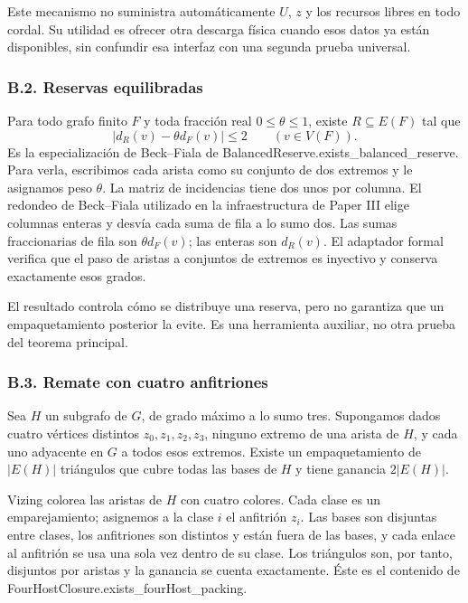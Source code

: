 \documentclass[spanish,11pt,a4paper]{article}
\begin{document}
Este mecanismo no suministra automáticamente \(U\), \(z\) y los recursos libres en todo cordal. Su utilidad es ofrecer otra descarga física cuando esos datos ya están disponibles, sin confundir esa interfaz con una segunda prueba universal.

\subsubsection{B.2. Reservas equilibradas}\label{b.2.-reservas-equilibradas}

Para todo grafo finito \(F\) y toda fracción real \(0\le\theta\le1\), existe \(R\subseteq E(F)\) tal que \[
|d_R(v)-\theta d_F(v)|\le2\qquad(v\in V(F)).
\tag{B.4}
\] Es la especialización de Beck--Fiala de {\ttfamily\small BalancedRese\discretionary{\hbox{\ensuremath{\hookrightarrow}}}{}{}rve.\discretionary{\hbox{\ensuremath{\hookrightarrow}}}{}{}exists\_\discretionary{\hbox{\ensuremath{\hookrightarrow}}}{}{}balanced\_\discretionary{\hbox{\ensuremath{\hookrightarrow}}}{}{}reserve}. Para verla, escribimos cada arista como su conjunto de dos extremos y le asignamos peso \(\theta\). La matriz de incidencias tiene dos unos por columna. El redondeo de Beck--Fiala utilizado en la infraestructura de Paper III elige columnas enteras y desvía cada suma de fila a lo sumo dos. Las sumas fraccionarias de fila son \(\theta d_F(v)\); las enteras son \(d_R(v)\). El adaptador formal verifica que el paso de aristas a conjuntos de extremos es inyectivo y conserva exactamente esos grados.

El resultado controla cómo se distribuye una reserva, pero no garantiza que un empaquetamiento posterior la evite. Es una herramienta auxiliar, no otra prueba del teorema principal.

\subsubsection{B.3. Remate con cuatro anfitriones}\label{b.3.-remate-con-cuatro-anfitriones}

Sea \(H\) un subgrafo de \(G\), de grado máximo a lo sumo tres. Supongamos dados cuatro vértices distintos \(z_0,z_1,z_2,z_3\), ninguno extremo de una arista de \(H\), y cada uno adyacente en \(G\) a todos esos extremos. Existe un empaquetamiento de \(|E(H)|\) triángulos que cubre todas las bases de \(H\) y tiene ganancia \(2|E(H)|\).

Vizing colorea las aristas de \(H\) con cuatro colores. Cada clase es un emparejamiento; asignemos a la clase \(i\) el anfitrión \(z_i\). Las bases son disjuntas entre clases, los anfitriones son distintos y están fuera de las bases, y cada enlace al anfitrión se usa una sola vez dentro de su clase. Los triángulos son, por tanto, disjuntos por aristas y la ganancia se cuenta exactamente. Éste es el contenido de {\ttfamily\small FourHostClos\discretionary{\hbox{\ensuremath{\hookrightarrow}}}{}{}ure.\discretionary{\hbox{\ensuremath{\hookrightarrow}}}{}{}exists\_\discretionary{\hbox{\ensuremath{\hookrightarrow}}}{}{}fourHost\_\discretionary{\hbox{\ensuremath{\hookrightarrow}}}{}{}packing}.
\end{document}
